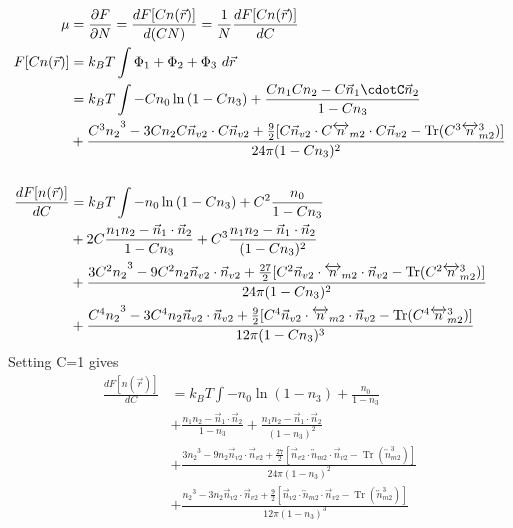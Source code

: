 \documentclass[double,12pt]{revtex4-2}
\begin{document}
\begin{align}
  \mu &= \frac{\partial F}{\partial N} = \frac{dF[Cn(\vec r)]}{d(CN)} = \frac{1}{N}\frac{dF[Cn(\vec r)]}{dC}\\
   F[Cn(\vec r)] &= k_BT\int \Phi_1 +\Phi_2+\Phi_3 ~d\vec r \\
   &= k_BT\int -Cn_0\ln\left(1-Cn_3\right) + \frac{Cn_1Cn_2-C\vec n_1\cdotC\vec n_2}{1-Cn_3} \\
   &+ \frac{{C^3n_2}^3-3Cn_2C\vec n_{v2}\cdot C\vec n_{v2}+\frac{9}{2}
       [C\vec n_{v2}\cdot{C\overleftrightarrow{n}_{m2}}\cdot{C\vec n_{v2}}
       -\operatorname{Tr}({C^3\overleftrightarrow n^3_{m2}})]}{24\pi(1-Cn_3)^2}    \\ \\
%   
  \frac{dF[n(\vec r)]}{dC}    &= k_BT\int -n_0\ln\left(1-Cn_3\right) + C^2\frac{n_0}{1-Cn_3} \\
   &+ 2C\frac{n_1n_2-\vec n_1\cdot\vec n_2}{1-Cn_3} +C^3 \frac{n_1n_2-\vec n_1\cdot\vec n_2}{(1-Cn_3)^2} \\   
   &+ \frac{{3C^2n_2}^3-9C^2n_2\vec n_{v2}\cdot \vec n_{v2} 
   + \frac{27}{2}[C^2\vec n_{v2}\cdot{\overleftrightarrow{n}_{m2}}\cdot{\vec n_{v2}} 
       -\operatorname{Tr}({C^2\overleftrightarrow n^3_{m2}})]}{24\pi(1-Cn_3)^2}   \\ 
    &+ \frac{{C^4n_2}^3-3C^4n_2\vec n_{v2}\cdot \vec n_{v2} 
    + \frac{9}{2}[C^4\vec n_{v2}\cdot{\overleftrightarrow{n}_{m2}}\cdot{\vec n_{v2}}   
       -\operatorname{Tr}({C^4\overleftrightarrow n^3_{m2}})]}{12\pi(1-Cn_3)^3}     
\end{align} 
Setting C=1 gives
\begin{align}
   \frac{dF[n(\vec r)]}{dC} &= k_BT\int -n_0\ln\left(1-n_3\right) + \frac{n_0}{1-n_3} \\
   &+ \frac{n_1n_2-\vec n_1\cdot\vec n_2}{1-n_3} + \frac{n_1n_2-\vec n_1\cdot\vec n_2}{(1-n_3)^2} \\   
   &+ \frac{{3n_2}^3-9n_2\vec n_{v2}\cdot \vec n_{v2} 
   + \frac{27}{2}[\vec n_{v2}\cdot{\overleftrightarrow{n}_{m2}}\cdot{\vec n_{v2}} 
       -\operatorname{Tr}({\overleftrightarrow n^3_{m2}})]}{24\pi(1-n_3)^2}   \\ 
    &+ \frac{{n_2}^3-3n_2\vec n_{v2}\cdot \vec n_{v2} 
    + \frac{9}{2}[\vec n_{v2}\cdot{\overleftrightarrow{n}_{m2}}\cdot{\vec n_{v2}}   
       -\operatorname{Tr}({\overleftrightarrow n^3_{m2}})]}{12\pi(1-n_3)^3}     
\end{align} 
\end{document}
